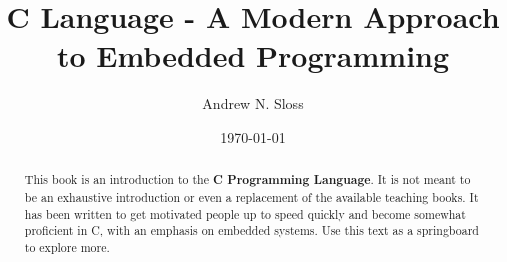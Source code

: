 \documentclass{article}
\begin{document}
\title{\textbf{C Language - A Modern Approach to Embedded Programming}}
\author{Andrew N. Sloss}
\date{\today}


\maketitle
\begin{abstract}
\noindent
This book is an introduction to the \textbf{C Programming Language}. It is not meant to be an exhaustive introduction or even a replacement of the available teaching books. It has been written to get motivated people up to speed quickly and become somewhat proficient in C, with an emphasis on embedded systems. Use this text as a springboard to explore more.
\end{abstract}

\newpage

\tableofcontents

\newpage

\lstlistoflistings

\newpage

\thispagestyle{empty}
 
\listoffigures
 
\listoftables
 
\clearpage
 


%
%


\newpage

\newpage

\newpage
 
\newpage

\newpage
  
\newpage
 
\newpage

\newpage
  
\newpage

\newpage
 
\newpage

\newpage
 
 \newpage

\newpage

\newpage
  
\newpage
 
\newpage
 
\newpage

\newpage

\newpage
 
\newpage

\newpage
  
\newpage
  
\newpage
  
\newpage
\printindex
\end{document}
